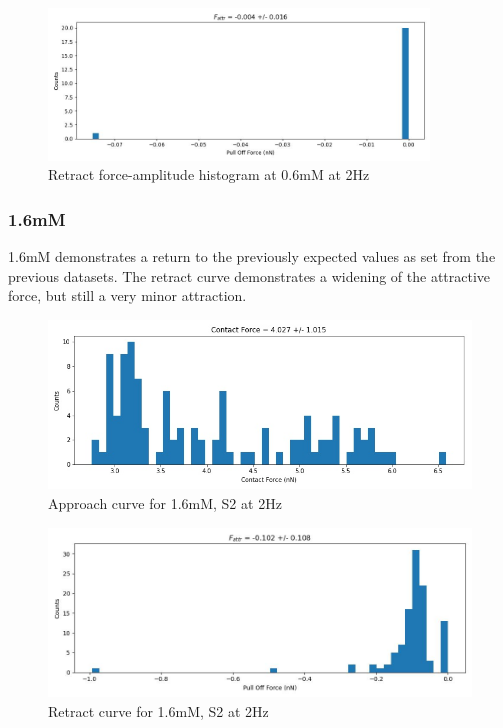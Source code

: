 \begin{figure}[h!]
\centering
\includegraphics[width=0.9\textwidth]{chapter7/Tip speed/0.6mM/retract_f_a_hist.jpg}
\caption{Retract force-amplitude histogram at 0.6mM at 2Hz}
\end{figure}

\newpage

\subsubsection*{1.6mM}
1.6mM demonstrates a return to the previously expected values as set from the previous datasets. The retract curve demonstrates a widening of the attractive force, but still a very minor attraction.
\begin{figure}[h!]
\centering
\includegraphics[width=.9\textwidth]{chapter7/Tip speed/1.6mM/S1 2Hz/approach_f_c_hist.jpg}
\caption{Approach curve for 1.6mM, S2 at 2Hz}
\end{figure}

\begin{figure}[h!]
\centering
\includegraphics[width=.9\textwidth]{chapter7/Tip speed/1.6mM/S1 2Hz/retract_f_a_hist.jpg}
\caption{Retract curve for 1.6mM, S2 at 2Hz}
\end{figure}


